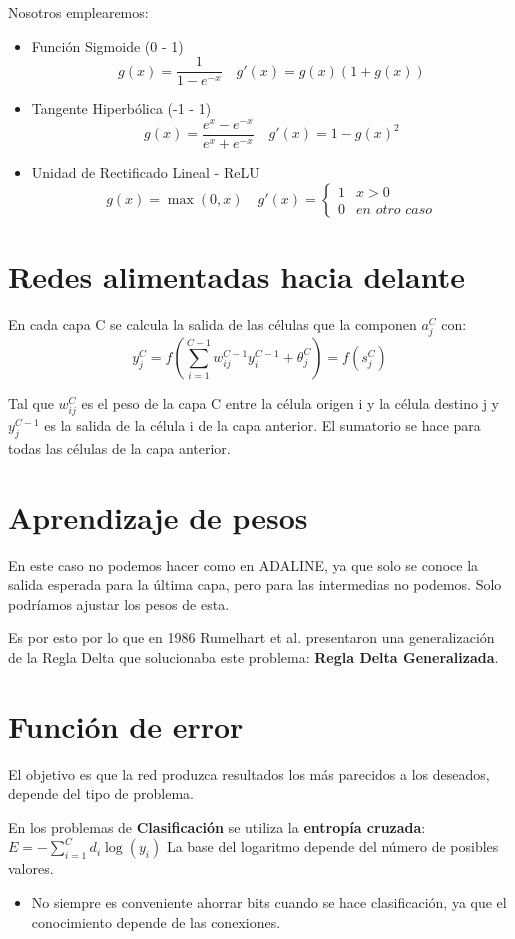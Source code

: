 \documentclass[12pt, twoside, openright]{report} %
\begin{document}
Nosotros emplearemos:
\begin{itemize}
	\item Función Sigmoide (0 - 1)
	      $$g(x)=\frac{1}{1-e^{-x}}\quad g'(x)=g(x)(1+g(x))$$
	\item Tangente Hiperbólica (-1 - 1) $$g(x)=\frac{e^x-e^{-x}}{e^x+e^{-x}} \quad g'(x)=1-g(x)^2$$
	\item Unidad de Rectificado Lineal - ReLU $$g(x)=\max(0,x) \quad g'(x)= \begin{cases}1 & x > 0\\0 & \textit{en otro caso}\end{cases}$$
\end{itemize}

\section{Redes alimentadas hacia delante}
En cada capa C se calcula la salida de las células que la componen $a^C_j$ con: 
$$y^C_j=f\left(\sum^{C-1}_{i=1} w^{C-1}_{ij}y^{C-1}_i+\theta_j^C\right)=f(s^{C}_{j})$$

Tal que $w^C_{ij}$ es el peso de la capa C entre la célula origen i y la célula destino j y $y^{C-1}_j$ es la salida de la célula i de la capa anterior. El sumatorio se hace para todas las células de la capa anterior.

\section{Aprendizaje de pesos}
En este caso no podemos hacer como en ADALINE, ya que solo se conoce la salida esperada para la última capa, pero para las intermedias no podemos. Solo podríamos ajustar los pesos de esta. 

Es por esto por lo que en 1986 Rumelhart et al. presentaron una generalización de la Regla Delta que solucionaba este problema: \textbf{Regla Delta Generalizada}.

\section{Función de error}
El objetivo es que la red produzca resultados los más parecidos a los deseados, depende del tipo de problema.
\pagebreak

En los problemas de \textbf{Clasificación} se utiliza la \textbf{entropía cruzada}: $E=-\sum^C_{i=1}d_i \log (y_i)$ La base del logaritmo depende del número de posibles valores.
\begin{itemize}
	\item No siempre es conveniente ahorrar bits cuando se hace clasificación, ya que el conocimiento depende de las conexiones.
\end{itemize}
\end{document}
